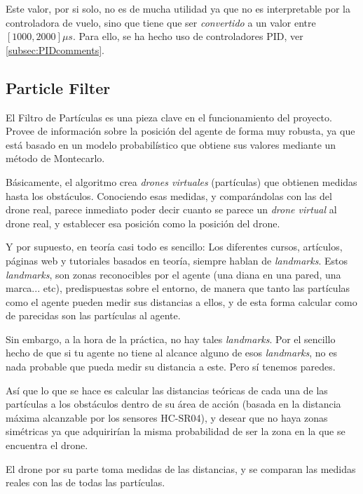 Este valor, por si solo, no es de mucha utilidad ya que no es interpretable por la controladora de vuelo, sino que tiene que ser \textit{convertido} a un valor entre $[1000, 2000]\mu s$. Para ello, se ha hecho uso de controladores PID, ver \ref{subsec:PIDcomments}.

\subsection{Particle Filter}
\label{subsec:PFcomments}
El Filtro de Partículas es una pieza clave en el funcionamiento del proyecto. Provee de información sobre la posición del agente de forma muy robusta, ya que está basado en un modelo probabilístico que obtiene sus valores mediante un método de Montecarlo. 

Básicamente, el algoritmo crea \emph{drones virtuales} (partículas) que obtienen medidas hasta los obstáculos. Conociendo esas medidas, y comparándolas con las del drone real, parece inmediato poder decir cuanto se parece un \emph{drone virtual} al drone real, y establecer esa posición como la posición del drone. 

Y por supuesto, en teoría casi todo es sencillo: Los diferentes cursos, artículos, páginas web y tutoriales basados en teoría, siempre hablan de \emph{landmarks}. Estos \emph{landmarks}, son zonas reconocibles por el agente (una diana en una pared, una marca... etc), predispuestas sobre el entorno, de manera que tanto las partículas como el agente pueden medir sus distancias a ellos, y de esta forma calcular como de parecidas son las partículas al agente. 

Sin embargo, a la hora de la práctica, no hay tales \emph{landmarks}. Por el sencillo hecho de que si tu agente no tiene al alcance alguno de esos \emph{landmarks}, no es nada probable que pueda medir su distancia a este. Pero sí tenemos paredes. 

Así que lo que se hace es calcular las distancias teóricas de cada una de las partículas a los obstáculos dentro de su área de acción (basada en la distancia máxima alcanzable por los sensores HC-SR04), y desear que no haya zonas simétricas ya que adquirirían la misma probabilidad de ser la zona en la que se encuentra el drone.

El drone por su parte toma medidas de las distancias, y se comparan las medidas reales con las de todas las partículas. 

